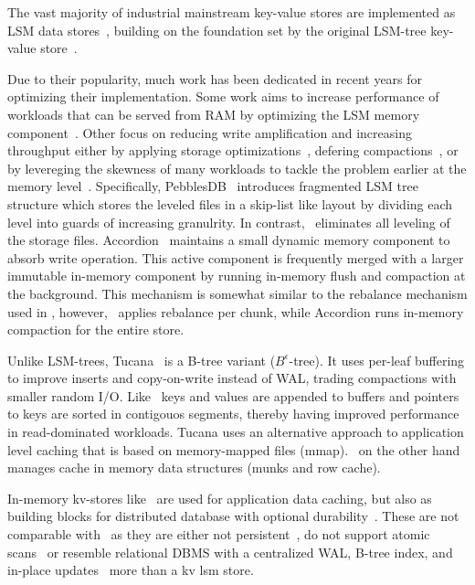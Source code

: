 

The vast majority of industrial mainstream key-value stores are  implemented as LSM data
stores~\cite{Bigtable2008,hbase,cassandra2010,rocksdb, scylladb}, building on the foundation set by the original LSM-tree key-value store~\cite{O'Neil1996, Muth1998}.

Due to their popularity, much work has been dedicated in recent years for optimizing their implementation. Some work aims to increase performance of workloads that can be served from 
RAM by optimizing the LSM memory component~\cite{clsm2015, accordion}. Other focus on reducing write amplification and increasing throughput either by applying storage optimizations~\cite{WiscKey, PebblesDB}, defering compactions~\cite{PebblesDB, triad}, or by levereging the skewness of many workloads to tackle the problem earlier at the memory level~\cite{ accordion, triad}.
Specifically, PebblesDB~\cite{PebblesDB} introduces fragmented LSM tree structure which stores the leveled files in a skip-list like layout by dividing each level into guards of increasing granulrity. In contrast, \sys\ eliminates all leveling of the storage files. 
Accordion~\cite{accordion} maintains a small dynamic memory component to absorb write operation. This active component is frequently merged with a larger immutable in-memory component by running in-memory flush and compaction at the background. This mechanism is somewhat similar to the rebalance mechanism used in \sys, however, \sys\ applies rebalance per chunk, while Accordion runs in-memory compaction for the entire store.

Unlike LSM-trees, Tucana~\cite{tucana} is a B-tree variant ($B^{\epsilon}$-tree). It uses per-leaf buffering to improve inserts and copy-on-write instead of WAL, trading compactions with smaller random I/O. 
Like \sys\ keys and values are appended to buffers and pointers to keys are sorted in contigouos segments, thereby having improved performance in read-dominated workloads.
Tucana uses an alternative approach to application level caching that is based on memory-mapped files (mmap). \sys\ on the other hand manages cache in memory data structures (munks and row cache).


In-memory kv-stores like~\cite{memcached, ignite, redis} are used for application data caching, but also as building blocks for distributed database with optional durability~\cite{ignite,redis}. These are not comparable with \sys\ as they are either not persistent~\cite{memcached}, do not support atomic scans~\cite{redis} or resemble  relational DBMS with a centralized WAL, B-tree index, and in-place updates~\cite{ignite}  more than a kv lsm store.
